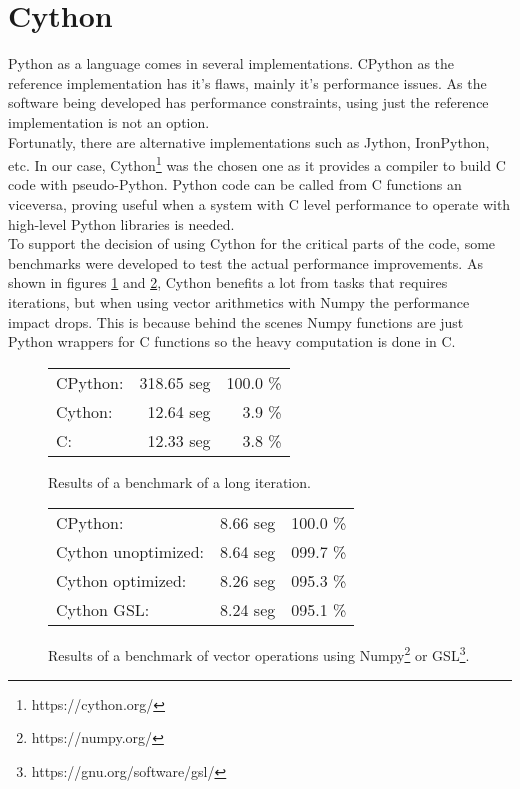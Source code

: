 \section{Cython}

Python as a language comes in several implementations. CPython as the reference
implementation has it's flaws, mainly it's performance issues. As the
software being developed has performance constraints, using just the reference
implementation is not an option.\\

Fortunatly, there are alternative implementations such as Jython, IronPython,
etc. In our case, Cython\footnote{https://cython.org/}\cite{Cython_book} was the
chosen one as it provides a compiler to build C code with pseudo-Python. Python code
can be called from C functions an viceversa, proving useful when a system
with C level performance to operate with high-level Python libraries is needed.\\

To support the decision of using Cython for the critical parts of the code,
some benchmarks were developed to test the actual performance improvements. As
shown in figures \ref{Cython:fig:1} and \ref{Cython:fig:2}, Cython benefits
a lot from tasks that requires iterations, but when using vector arithmetics
with Numpy the performance impact drops. This is because behind the scenes
Numpy functions are just Python wrappers for C functions so the heavy
computation is done in C.\\

\begin{figure}[ht!]
  \begin{center}
    \begin{tabular}{l r r}
      CPython:  & 318.65 seg & 100.0 \% \\
      Cython:   & 12.64 seg  & 3.9 \%   \\
      C:        & 12.33 seg  & 3.8 \%   \\
    \end{tabular}
  \end{center}
  \caption{Results of a benchmark of a long iteration.}
  \label{Cython:fig:1}
\end{figure}

\begin{figure}[ht!]
  \begin{center}
    \begin{tabular}{l r r}
      CPython:            & 8.66 seg & 100.0 \% \\
      Cython unoptimized: & 8.64 seg & 099.7 \% \\
      Cython optimized:   & 8.26 seg & 095.3 \% \\
      Cython GSL:         & 8.24 seg & 095.1 \%
    \end{tabular}
  \end{center}
  \caption{Results of a benchmark of vector operations using
  Numpy\footnote{https://numpy.org/} or
  GSL\footnote{https://gnu.org/software/gsl/}.}
  \label{Cython:fig:2}
\end{figure}

